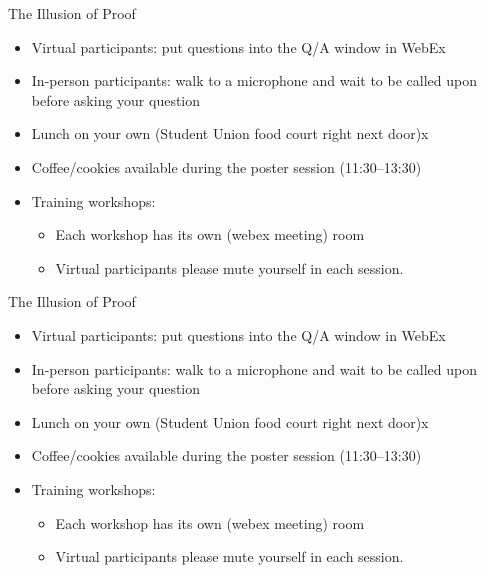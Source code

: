 \documentclass[aspectratio=169, 12pt]{beamer}
\begin{document}
\begin{frame}{The Illusion of Proof}
  \begin{itemize}
  \item Virtual participants: put questions into the Q/A window in WebEx
  \item In-person participants: walk to a microphone and wait to be called upon
    before asking your question
  \item Lunch on your own (Student Union food court right next door)x
  \item Coffee/cookies available during the poster session (11:30--13:30)
  \item Training workshops:
    \begin{itemize}
    \item Each workshop has its own (webex meeting) room
    \item Virtual participants please mute yourself in each session.
    \end{itemize}
  \end{itemize}
\end{frame}
\begin{frame}{The Illusion of Proof}
  \begin{itemize}
  \item Virtual participants: put questions into the Q/A window in WebEx
  \item In-person participants: walk to a microphone and wait to be called upon
    before asking your question
  \item Lunch on your own (Student Union food court right next door)x
  \item Coffee/cookies available during the poster session (11:30--13:30)
  \item Training workshops:
    \begin{itemize}
    \item Each workshop has its own (webex meeting) room
    \item Virtual participants please mute yourself in each session.
    \end{itemize}
  \end{itemize}
\end{frame}
\end{document}
